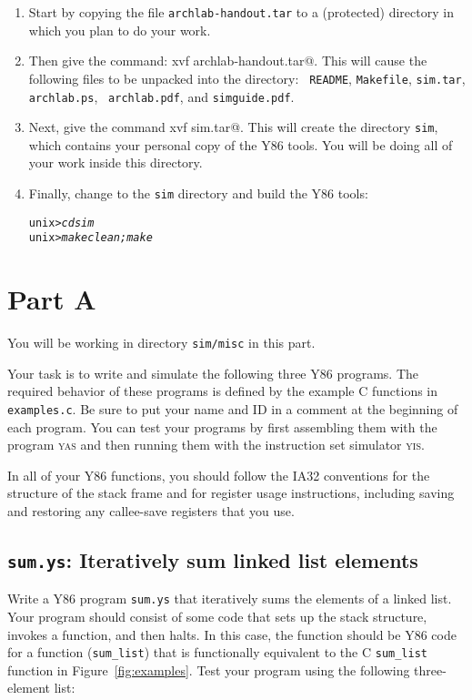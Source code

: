 \documentclass[11pt]{article}
\newenvironment{tty}%
{\small\begin{alltt}}%
{\end{alltt}}
\begin{document}
\begin{enumerate}
\item Start by copying the file {\tt archlab-handout.tar}
to a (protected) directory in which you plan to do your work.

\item Then give the command: \verb@tar xvf archlab-handout.tar@.  This will
cause the following files to be unpacked into the directory: {\tt
README}, {\tt Makefile}, {\tt sim.tar}, {\tt archlab.ps}, {\tt
archlab.pdf}, and {\tt simguide.pdf}.  

\item Next, give the command \verb@tar xvf sim.tar@. This will create the
directory {\tt sim}, which contains your personal copy of the Y86
tools. You will be doing all of your work inside this directory.

\item Finally, change to the {\tt sim} directory and build the
Y86 tools:
\begin{tty}
unix> {\em cd sim}
unix> {\em make clean; make}
\end{tty}
\end{enumerate}


\section{Part A}

You will be working in directory \texttt{sim/misc} in this part.

Your task is to write and simulate the following three Y86 programs.
The required behavior of these programs is defined by the example C
functions in \texttt{examples.c}. Be sure to put your name and ID in a
comment at the beginning of each program.  You can test your programs by first 
assembling them with the program \textsc{yas} and then running them with the instruction set simulator \textsc{yis}.

In all of your Y86 functions, you should follow the IA32 conventions
for the structure of the stack frame and for register usage
instructions, including saving and restoring any callee-save registers
that you use.

\subsection*{\texttt{sum.ys}: Iteratively sum linked list elements}

Write a Y86 program \texttt{sum.ys} that iteratively sums the
elements of a linked list. Your program should consist of some code
that sets up the stack structure, invokes a function, and then halts.
In this case, the function should be
Y86 code for a function (\texttt{sum\_list}) 
that is functionally equivalent to the C \texttt{sum\_list} function in
Figure~\ref{fig:examples}. Test your program using the following
three-element list:
\end{document}
